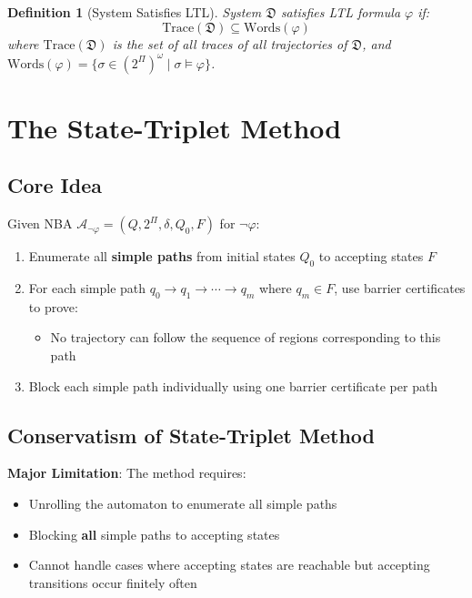 \documentclass{article}
\newtheorem{definition}{Definition}
\begin{document}
\begin{definition}[System Satisfies LTL]
System $\mathfrak{D}$ satisfies LTL formula $\varphi$ if:
\begin{equation}
\text{Trace}(\mathfrak{D}) \subseteq \text{Words}(\varphi)
\end{equation}
where $\text{Trace}(\mathfrak{D})$ is the set of all traces of all trajectories of $\mathfrak{D}$, and $\text{Words}(\varphi) = \{\sigma \in (2^\Pi)^\omega \mid \sigma \models \varphi\}$.
\end{definition}

\section{The State-Triplet Method}

\subsection{Core Idea}

Given NBA $\mathcal{A}_{\neg\varphi} = (Q, 2^\Pi, \delta, Q_0, F)$ for $\neg\varphi$:

\begin{enumerate}
    \item Enumerate all \textbf{simple paths} from initial states $Q_0$ to accepting states $F$
    \item For each simple path $q_0 \to q_1 \to \cdots \to q_m$ where $q_m \in F$, use barrier certificates to prove:
    \begin{itemize}
        \item No trajectory can follow the sequence of regions corresponding to this path
    \end{itemize}
    \item Block each simple path individually using one barrier certificate per path
\end{enumerate}

\subsection{Conservatism of State-Triplet Method}

\textbf{Major Limitation}: The method requires:
\begin{itemize}
    \item Unrolling the automaton to enumerate all simple paths
    \item Blocking \textbf{all} simple paths to accepting states
    \item Cannot handle cases where accepting states are reachable but accepting transitions occur finitely often
\end{itemize}
\end{document}
